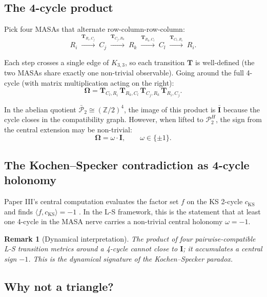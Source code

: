 \documentclass[11pt]{article}
\newtheorem{remark}[theorem]{Remark}
\begin{document}
\subsection{The 4-cycle product}
\label{sec:4cycle-product}

Pick four MASAs that alternate row-column-row-column:
\[
R_i \;\xrightarrow{\mathbf{T}_{R_i,C_j}}\; C_j
\;\xrightarrow{\mathbf{T}_{C_j,R_k}}\; R_k
\;\xrightarrow{\mathbf{T}_{R_k,C_l}}\; C_l
\;\xrightarrow{\mathbf{T}_{C_l,R_i}}\; R_i.
\]

Each step crosses a single edge of $K_{3,3}$, so each transition $\mathbf{T}$
is well-defined (the two MASAs share exactly one non-trivial observable).
Going around the full 4-cycle (with matrix multiplication acting on the right):
\[
\mathbf{\Omega} = \mathbf{T}_{C_l, R_i} \,\mathbf{T}_{R_k, C_l}
\,\mathbf{T}_{C_j, R_k} \,\mathbf{T}_{R_i, C_j}.
\]

In the abelian quotient $\bar{\mathcal{P}}_2 \cong (\mathbb{Z}/2)^4$, the image
of this product is $\bar{\mathbf{I}}$ because the cycle closes in the
compatibility graph. However, when lifted to $\mathcal{P}_2^H$, the sign from
the central extension may be non-trivial:
\[
\boxed{\mathbf{\Omega} = \omega \cdot \mathbf{I}, \qquad
\omega \in \{\pm 1\}.}
\]

\subsection{The Kochen--Specker contradiction as 4-cycle holonomy}
\label{sec:ks-holonomy}

Paper III's central computation evaluates the factor set $f$ on the KS 2-cycle
$c_{\text{KS}}$ and finds $\langle f, c_{\text{KS}} \rangle = -1$
\cite{PaperIII}. In the L-S framework, this is the statement that at least one
4-cycle in the MASA nerve carries a non-trivial central holonomy $\omega = -1$.

\begin{remark}[Dynamical interpretation]
The product of four pairwise-compatible L-S transition metrics around a 4-cycle
cannot close to $\mathbf{I}$; it accumulates a central sign $-1$. This is the
dynamical signature of the Kochen--Specker paradox.
\end{remark}

\subsection{Why not a triangle?}
\label{sec:no-triangle}
\end{document}
